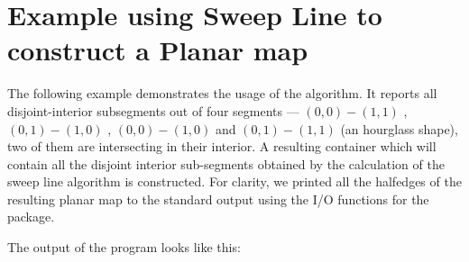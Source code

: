\section{Example using Sweep Line to construct a Planar map}
\label{ssec:example1_sweep}
The following example demonstrates the usage of the 
 algorithm. 
It reports all disjoint-interior subsegments out of four segments
--- $(0,0)-(1,1)$ , $(0,1)-(1,0)$ , $(0,0)-(1,0)$ and $(0,1)-(1,1)$
(an hourglass shape), two of them are intersecting in their
interior. A resulting container which will contain all the disjoint
interior sub-segments obtained by the calculation of the sweep
line algorithm is constructed. For clarity, we printed all the halfedges of the
resulting planar map to the standard output using the I/O functions
for the  package.


The output of the program looks like this:








